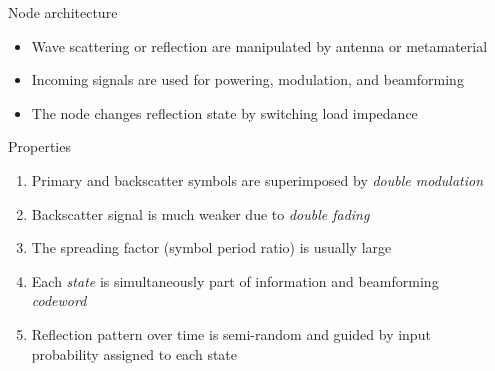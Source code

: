 \documentclass[final,xcolor={table}]{beamer}
\newlength{\sepwidth}
\newlength{\colwidth}
\newcommand{\separatorcolumn}{\begin{column}{\sepwidth}\end{column}}
\begin{document}
\begin{frame}[t]
\begin{columns}[t]
\begin{column}{\colwidth}
			\begin{block}{Node architecture}
				\begin{figure}[!t]
					\captionsetup[subfloat]{captionskip=20pt}
					\centering
					\label{fg:riscatter_node}
				\end{figure}
				\vspace{0.62cm}
				\begin{itemize}\setlength\itemsep{20pt}
					\item Wave scattering or reflection are manipulated by antenna or metamaterial
					\item Incoming signals are used for powering, modulation, and beamforming
					\item The node changes reflection state by switching load impedance
				\end{itemize}
			\end{block}

			\begin{alertblock}{Properties}
				\begin{enumerate}\setlength\itemsep{20pt}
					\item Primary and backscatter symbols are superimposed by \emph{double modulation}
					\item Backscatter signal is much weaker due to \emph{double fading}
					\item The spreading factor (symbol period ratio) is usually large
					\item Each \emph{state} is simultaneously part of information and beamforming \emph{codeword}
					\item Reflection pattern over time is semi-random and guided by input probability assigned to each state
				\end{enumerate}
			\end{alertblock}
		\end{column}

		\separatorcolumn


\end{columns}
\end{frame}
\end{document}
